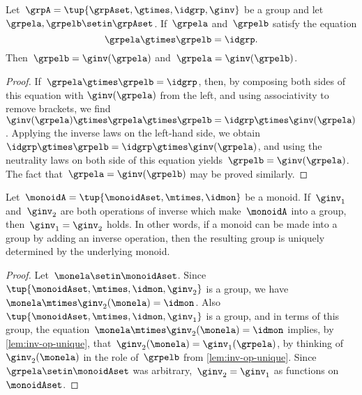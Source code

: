 \begin{lemma}
    \label{lem:inv-op-unique}
    Let~$\grpA = \tup{ \grpAset, \gtimes, \idgrp, \ginv }$ be a group and let~$\grpela, \grpelb \setin \grpAset$.
    If~$\grpela$ and~$\grpelb$ satisfy the equation
    \begin{equation}
        \grpela \gtimes \grpelb = \idgrp.
    \end{equation}
    Then~$\grpelb = \ginv( \grpela )$ and~$\grpela = \ginv(\grpelb)$.
\end{lemma}

\begin{proof}
    If~$\grpela \gtimes \grpelb = \idgrp$, then, by composing both sides of this equation with $\ginv(\grpela)$ from the left, and using associativity to remove brackets, we find~$\ginv(\grpela) \gtimes \grpela \gtimes \grpelb = \idgrp \gtimes \ginv(\grpela)$.
    Applying the inverse laws on the left-hand side, we obtain~$\idgrp \gtimes \grpelb = \idgrp \gtimes \ginv(\grpela)$, and using the neutrality laws on both side of this equation yields~$\grpelb =  \ginv(\grpela)$.
    The fact that~$\grpela = \ginv(\grpelb)$ may be proved similarly.
\end{proof}

\begin{corollary}
    \label{cor:inv-op-unique}
    Let~$\monoidA = \tup{\monoidAset, \mtimes,  \idmon }$ be a monoid.
    If~$\ginv_1$ and~$\ginv_2$ are both operations of inverse which make~$\monoidA$ into a group, then~$\ginv_1 =\ginv_2$ holds.
    In other words, if a monoid can be made into a group by adding an inverse operation, then the resulting group is uniquely determined by the underlying monoid.
\end{corollary}

\begin{proof}
    Let~$\monela \setin \monoidAset$.
    Since~$\tup{\monoidAset, \mtimes,  \idmon, \ginv_2 }$ is a group, we have~$\monela \mtimes \ginv_2(\monela) = \idmon$.
    Also~$\tup{\monoidAset, \mtimes,  \idmon, \ginv_1}$ is a group, and in terms of this group, the equation~$\monela \mtimes \ginv_2(\monela) = \idmon$ implies, by \cref{lem:inv-op-unique}, that~$\ginv_2(\monela) = \ginv_1(\grpela)$, by thinking of~$\ginv_2(\monela)$ in the role of~$\grpelb$ from \cref{lem:inv-op-unique}.
    Since~$\grpela \setin \monoidAset$ was arbitrary,~$\ginv_2 = \ginv_1$ as functions on~$\monoidAset$.
\end{proof}




